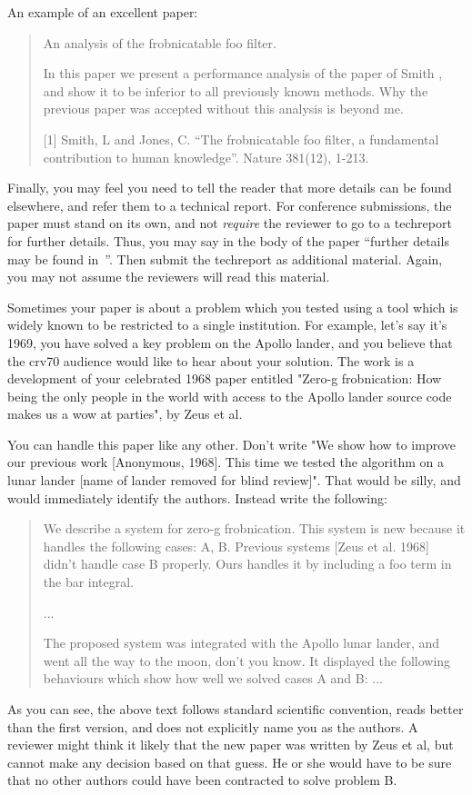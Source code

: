\documentclass[10pt,twocolumn,letterpaper]{article}
\begin{document}
   
An example of an excellent paper:   
   
\begin{quote}
\begin{center}
     An analysis of the frobnicatable foo filter. 
\end{center}
   
   In this paper we present a performance analysis of the
   paper of Smith \etal [1], and show it to be inferior to
   all previously known methods.  Why the previous paper
   was accepted without this analysis is beyond me.
   
   [1] Smith, L and Jones, C. ``The frobnicatable foo
   filter, a fundamental contribution to human knowledge''.
   Nature 381(12), 1-213.
\end{quote}


Finally, you may feel you need to tell the reader that more details can be
found elsewhere, and refer them to a technical report.  For conference
submissions, the paper must stand on its own, and not {\em require} the
reviewer to go to a techreport for further details.  Thus, you may say in
the body of the paper ``further details may be found
in~\cite{Authors06b}''.  Then submit the techreport as additional material.
Again, you may not assume the reviewers will read this material.

Sometimes your paper is about a problem which you tested using a tool which
is widely known to be restricted to a single institution.  For example,
let's say it's 1969, you have solved a key problem on the Apollo lander,
and you believe that the crv70 audience would like to hear about your
solution.  The work is a development of your celebrated 1968 paper entitled
"Zero-g frobnication: How being the only people in the world with access to
the Apollo lander source code makes us a wow at parties", by Zeus et al.

You can handle this paper like any other.  Don't write "We show how to
improve our previous work [Anonymous, 1968].  This time we tested the
algorithm on a lunar lander [name of lander removed for blind review]".
That would be silly, and would immediately identify the authors. Instead
write the following:
\begin{quotation}
\noindent
   We describe a system for zero-g frobnication.  This
   system is new because it handles the following cases:
   A, B.  Previous systems [Zeus et al. 1968] didn't
   handle case B properly.  Ours handles it by including
   a foo term in the bar integral.

   ...

   The proposed system was integrated with the Apollo
   lunar lander, and went all the way to the moon, don't
   you know.  It displayed the following behaviours
   which show how well we solved cases A and B: ...
\end{quotation}
As you can see, the above text follows standard scientific convention,
reads better than the first version, and does not explicitly name you as
the authors.  A reviewer might think it likely that the new paper was
written by Zeus et al, but cannot make any decision based on that guess.
He or she would have to be sure that no other authors could have been
contracted to solve problem B.
\end{document}
